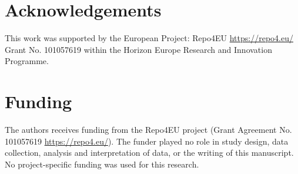 \section*{Acknowledgements}
This work was supported by the European Project: Repo4EU
\url{https://repo4.eu/} Grant No. 101057619 within the Horizon Europe Research and Innovation Programme.

\section*{Funding}
The authors receives funding from the Repo4EU project (Grant Agreement No. 101057619 \url{https://repo4.eu/}). The funder played no role in study design, data collection, analysis and interpretation of data, or the writing of this manuscript. No project-specific funding was used for this research.